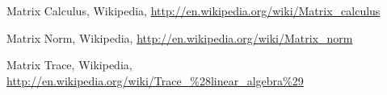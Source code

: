 	Matrix Calculus, Wikipedia, 
	\url{http://en.wikipedia.org/wiki/Matrix_calculus}
	
	Matrix Norm, Wikipedia, 
	\url{http://en.wikipedia.org/wiki/Matrix_norm}
	
	Matrix Trace, Wikipedia, 
	\url{http://en.wikipedia.org/wiki/Trace_%28linear_algebra%29}